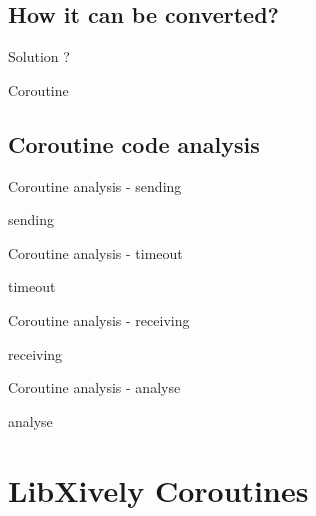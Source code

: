 \documentclass{beamer}
\begin{document}
\subsection{ How it can be converted? }

\begin{frame}{ Solution ? }
      \begin{block}{Coroutine}
         \scalebox{0.65} {
            
         }
      \end{block}
\end{frame}

\subsection { Coroutine code analysis }

\begin{frame} { Coroutine analysis - sending }
   \begin{block}{ sending }
      \scalebox{1.0} {
         
      }
   \end{block}
\end{frame}

\begin{frame} { Coroutine analysis - timeout }
   \begin{block}{ timeout }
      \scalebox{1.0} {
         
      }
   \end{block}
\end{frame}

\begin{frame} { Coroutine analysis - receiving }
   \begin{block}{ receiving }
      \scalebox{1.0} {
         
      }
   \end{block}
\end{frame}

\begin{frame} { Coroutine analysis - analyse }
   \begin{block}{ analyse }
      \scalebox{1.0} {
         
      }
   \end{block}
\end{frame}

\section{ LibXively Coroutines }
\end{document}
